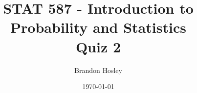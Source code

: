 \documentclass[answers]{exam}
\title{STAT 587 - Introduction to Probability and Statistics%
	\\ Quiz 2}
\author{Brandon Hosley}
\date{\today}
\begin{document}
\maketitle
\begin{questions}

\question 

\begin{solution}

\end{solution}

\question 

\begin{solution}

\end{solution}

\end{questions}
\end{document}

